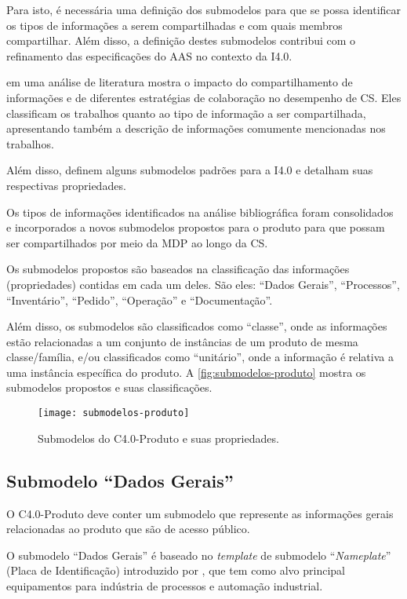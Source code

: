 Para isto, é necessária uma definição dos submodelos para que se possa identificar os tipos de informações a serem compartilhadas e com quais membros compartilhar. Além disso, a definição destes submodelos contribui com o refinamento das especificações do AAS no contexto da I4.0.

 em uma análise de literatura mostra o impacto do compartilhamento de informações e de diferentes estratégias de colaboração no desempenho de CS. Eles classificam os trabalhos quanto ao tipo de informação a ser compartilhada, apresentando também a descrição de informações comumente mencionadas nos trabalhos.

Além disso,  definem alguns submodelos padrões para a I4.0 e detalham suas respectivas propriedades.

Os tipos de informações identificados na análise bibliográfica foram consolidados e incorporados a novos submodelos propostos para o produto para que possam ser compartilhados por meio da MDP ao longo da CS.

Os submodelos propostos são baseados na classificação das informações (propriedades) contidas em cada um deles. São eles: ``Dados Gerais'', ``Processos'', ``Inventário'', ``Pedido'', ``Operação'' e ``Documentação''.

Além disso, os submodelos são classificados como ``classe'', onde as informações estão relacionadas a um conjunto de instâncias de um produto de mesma classe/família, e/ou classificados como ``unitário'', onde a informação é relativa a uma instância específica do produto. A \autoref{fig:submodelos-produto} mostra os submodelos propostos e suas classificações.

\begin{figure}[htb]
	\centering
	\texttt{[image: submodelos-produto]}
	\caption{Submodelos do C4.0-Produto e suas propriedades.}
	\label{fig:submodelos-produto}
\end{figure}

\subsection{Submodelo ``Dados Gerais''}

O C4.0-Produto deve conter um submodelo que represente as informações gerais relacionadas ao produto que são de acesso público.

O submodelo ``Dados Gerais'' é baseado no \textit{template} de submodelo ``\textit{Nameplate}'' (Placa de Identificação) introduzido por , que tem como alvo principal equipamentos para indústria de processos e automação industrial.

